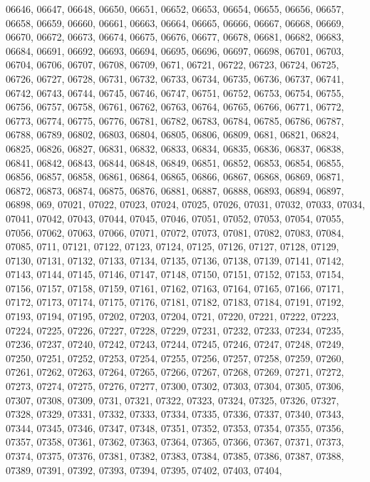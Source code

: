 {06646,
06647,
06648,
06650,
06651,
06652,
06653,
06654,
06655,
06656,
06657,
06658,
06659,
06660,
06661,
06663,
06664,
06665,
06666,
06667,
06668,
06669,
06670,
06672,
06673,
06674,
06675,
06676,
06677,
06678,
06681,
06682,
06683,
06684,
06691,
06692,
06693,
06694,
06695,
06696,
06697,
06698,
06701,
06703,
06704,
06706,
06707,
06708,
06709,
0671,
06721,
06722,
06723,
06724,
06725,
06726,
06727,
06728,
06731,
06732,
06733,
06734,
06735,
06736,
06737,
06741,
06742,
06743,
06744,
06745,
06746,
06747,
06751,
06752,
06753,
06754,
06755,
06756,
06757,
06758,
06761,
06762,
06763,
06764,
06765,
06766,
06771,
06772,
06773,
06774,
06775,
06776,
06781,
06782,
06783,
06784,
06785,
06786,
06787,
06788,
06789,
06802,
06803,
06804,
06805,
06806,
06809,
0681,
06821,
06824,
06825,
06826,
06827,
06831,
06832,
06833,
06834,
06835,
06836,
06837,
06838,
06841,
06842,
06843,
06844,
06848,
06849,
06851,
06852,
06853,
06854,
06855,
06856,
06857,
06858,
06861,
06864,
06865,
06866,
06867,
06868,
06869,
06871,
06872,
06873,
06874,
06875,
06876,
06881,
06887,
06888,
06893,
06894,
06897,
06898,
069,
07021,
07022,
07023,
07024,
07025,
07026,
07031,
07032,
07033,
07034,
07041,
07042,
07043,
07044,
07045,
07046,
07051,
07052,
07053,
07054,
07055,
07056,
07062,
07063,
07066,
07071,
07072,
07073,
07081,
07082,
07083,
07084,
07085,
0711,
07121,
07122,
07123,
07124,
07125,
07126,
07127,
07128,
07129,
07130,
07131,
07132,
07133,
07134,
07135,
07136,
07138,
07139,
07141,
07142,
07143,
07144,
07145,
07146,
07147,
07148,
07150,
07151,
07152,
07153,
07154,
07156,
07157,
07158,
07159,
07161,
07162,
07163,
07164,
07165,
07166,
07171,
07172,
07173,
07174,
07175,
07176,
07181,
07182,
07183,
07184,
07191,
07192,
07193,
07194,
07195,
07202,
07203,
07204,
0721,
07220,
07221,
07222,
07223,
07224,
07225,
07226,
07227,
07228,
07229,
07231,
07232,
07233,
07234,
07235,
07236,
07237,
07240,
07242,
07243,
07244,
07245,
07246,
07247,
07248,
07249,
07250,
07251,
07252,
07253,
07254,
07255,
07256,
07257,
07258,
07259,
07260,
07261,
07262,
07263,
07264,
07265,
07266,
07267,
07268,
07269,
07271,
07272,
07273,
07274,
07275,
07276,
07277,
07300,
07302,
07303,
07304,
07305,
07306,
07307,
07308,
07309,
0731,
07321,
07322,
07323,
07324,
07325,
07326,
07327,
07328,
07329,
07331,
07332,
07333,
07334,
07335,
07336,
07337,
07340,
07343,
07344,
07345,
07346,
07347,
07348,
07351,
07352,
07353,
07354,
07355,
07356,
07357,
07358,
07361,
07362,
07363,
07364,
07365,
07366,
07367,
07371,
07373,
07374,
07375,
07376,
07381,
07382,
07383,
07384,
07385,
07386,
07387,
07388,
07389,
07391,
07392,
07393,
07394,
07395,
07402,
07403,
07404,
}
